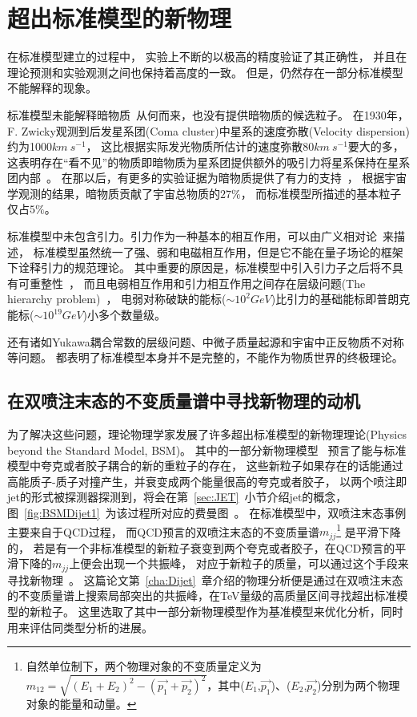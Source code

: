 \section{超出标准模型的新物理}
\label{sec:BSM}

在标准模型建立的过程中，
实验上不断的以极高的精度验证了其正确性，
并且在理论预测和实验观测之间也保持着高度的一致。
但是，仍然存在一部分标准模型不能解释的现象。

标准模型未能解释暗物质~\cite{DARKMATTER1}从何而来，也没有提供暗物质的候选粒子。
在1930年，F. Zwicky观测到后发星系团(Coma cluster)中星系的速度弥散(Velocity dispersion)约为1000$km~s^{-1}$，
这比根据实际发光物质所估计的速度弥散80$km~s^{-1}$要大的多，
这表明存在“看不见”的物质即暗物质为星系团提供额外的吸引力将星系保持在星系团内部~\cite{DARKMATTER2}。
在那以后，有更多的实验证据为暗物质提供了有力的支持~\cite{DARKMATTER1}，
根据宇宙学观测的结果，暗物质贡献了宇宙总物质的$27\%$，
而标准模型所描述的基本粒子仅占$5\%$。

标准模型中未包含引力。引力作为一种基本的相互作用，可以由广义相对论~\cite{GRE}来描述，
标准模型虽然统一了强、弱和电磁相互作用，但是它不能在量子场论的框架下诠释引力的规范理论。
其中重要的原因是，标准模型中引入引力子之后将不具有可重整性~\cite{GRE1}，
而且电弱相互作用和引力相互作用之间存在层级问题(The hierarchy problem)~\cite{HP}，
电弱对称破缺的能标($\sim 10^{2}GeV$)比引力的基础能标即普朗克能标($\sim 10^{19}GeV$)小多个数量级。

还有诸如Yukawa耦合常数的层级问题、中微子质量起源和宇宙中正反物质不对称等问题。
都表明了标准模型本身并不是完整的，不能作为物质世界的终极理论。



\subsection{在双喷注末态的不变质量谱中寻找新物理的动机}
\label{sec:BSMDijet}

为了解决这些问题，理论物理学家发展了许多超出标准模型的新物理理论(Physics beyond the Standard Model, BSM)。
其中的一部分新物理模型~\cite{qstar1,qstar2,zprime1,zprime3,wprime1,Chizhov:2009fc,Chizhov:2010jg,DM1,DM2,DM3,qbh1,qbh2,RS1,RS2,ADD}
预言了能与标准模型中夸克或者胶子耦合的新的重粒子的存在，
这些新粒子如果存在的话能通过高能质子-质子对撞产生，并衰变成两个能量很高的夸克或者胶子，
以两个喷注即jet的形式被探测器探测到，将会在第~\ref{sec:JET}~小节介绍jet的概念，
图~\ref{fig:BSMDijet1}~为该过程所对应的费曼图~\cite{FEYNR}。
在标准模型中，双喷注末态事例主要来自于QCD过程，
而QCD预言的双喷注末态的不变质量谱$m_{jj}
$\footnote{自然单位制下，两个物理对象的不变质量定义为$m_{12}=\sqrt{(E_1+E_2)^2-(\vec{p_1}+\vec{p_2})^2}$，其中($E_1$,$\vec{p_1}$)、($E_2$,$\vec{p_2}$)分别为两个物理对象的能量和动量。}
是平滑下降的，
若是有一个非标准模型的新粒子衰变到两个夸克或者胶子，在QCD预言的平滑下降的$m_{jj}$上便会出现一个共振峰，
对应于新粒子的质量，可以通过这个手段来寻找新物理~\cite{UA3}。
这篇论文第~\ref{cha:Dijet}~章介绍的物理分析便是通过在双喷注末态的不变质量谱上搜索局部突出的共振峰，在TeV量级的高质量区间寻找超出标准模型的新粒子。
这里选取了其中一部分新物理模型作为基准模型来优化分析，同时用来评估同类型分析的进展。

